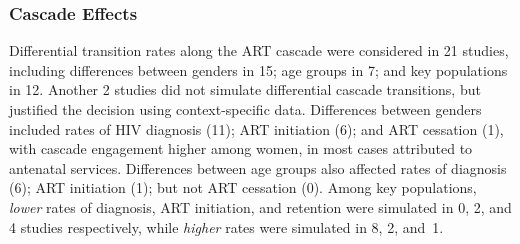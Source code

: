 \subsubsection{Cascade Effects}\label{sr.res.f.cascade}
Differential transition rates along the ART cascade were considered in
21 studies, including differences between
genders in 15; age groups in 7; and key populations in 12.
Another 2 studies did not simulate differential cascade transitions,
but justified the decision using context-specific data.
Differences between genders included rates of
HIV diagnosis (11); ART initiation (6); and ART cessation (1),
with cascade engagement higher among women,
in most cases attributed to antenatal services.
Differences between age groups also affected
rates of diagnosis (6); ART initiation (1); but not ART cessation (0).
Among key populations, \emph{lower} rates of
diagnosis, ART initiation, and retention were simulated in 0, 2, and 4
studies respectively, while \emph{higher} rates were simulated in 8, 2, and~1.

